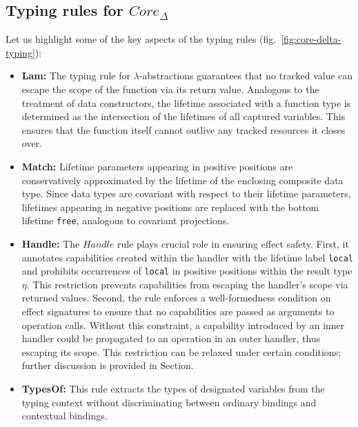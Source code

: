 \documentclass[acmsmall]{acmart}
\begin{document}
\subsection{Typing rules for $Core_\Delta$}

Let us highlight some of the key aspects of the typing rules (fig.\ \ref{fig:core-delta-typing}):
\begin{itemize} %
    \item \textbf{Lam:} The typing rule for $\lambda$-abstractions guarantees that no tracked value can escape the scope of the function via its return value.
    Analogous to the treatment of data constructors, the lifetime associated with a function type is determined as the intersection of the lifetimes of all captured variables.
    This ensures that the function itself cannot outlive any tracked resources it closes over.
    \item \textbf{Match:} Lifetime parameters appearing in positive positions are conservatively approximated by the lifetime of the enclosing composite data type.
    Since data types are covariant with respect to their lifetime parameters, lifetimes appearing in negative positions are replaced with the bottom lifetime \texttt{free}, analogous to covariant projections. %
    \item \textbf{Handle:} The $Handle$ rule plays crucial role in ensuring effect safety.
    First, it annotates capabilities created within the handler with the lifetime label \texttt{local} and prohibits occurrences of \texttt{local} in positive positions within the result type $\eta$.
    This restriction prevents capabilities from escaping the handler’s scope via returned values.
    Second, the rule enforces a well-formedness condition on effect signatures to ensure that no capabilities are passed as arguments to operation calls. %
    Without this constraint, a capability introduced by an inner handler could be propagated to an operation in an outer handler, thus escaping its scope.
    This restriction can be relaxed under certain conditions; further discussion is provided in Section. %
    \item \textbf{TypesOf:} This rule extracts the types of designated variables from the typing context without discriminating between ordinary bindings and contextual bindings.
\end{itemize}
\end{document}
